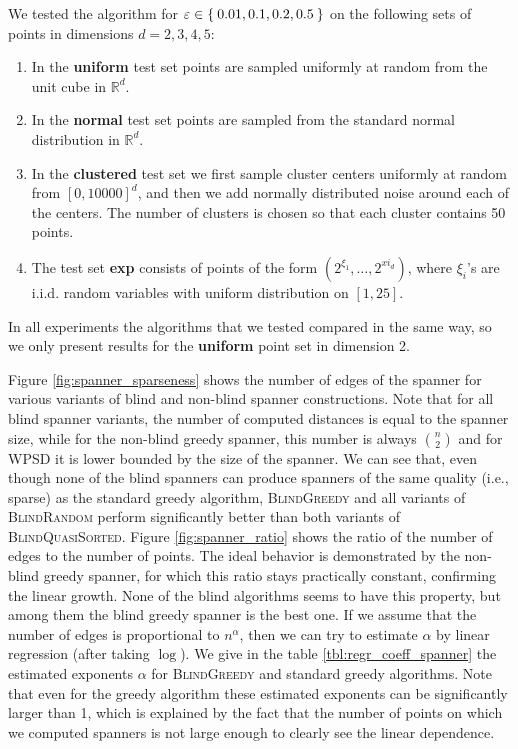\documentclass[a4paper,UKenglish,cleveref, autoref]{lipics-v2019}
\newcommand{\eps}{\varepsilon}
\begin{document}


We tested the algorithm for $\eps \in \Set{0.01, 0.1, 0.2, 0.5}$ on the following sets of points in dimensions $d = 2,3,4,5$:
\begin{enumerate}
    \item In the \textbf{uniform} test set points are sampled uniformly at
        random from the unit cube in $\mathbb{R}^d$.
    \item In the \textbf{normal} test set points are sampled from the standard
        normal distribution in $\mathbb{R}^d$.
    \item In the \textbf{clustered} test set we first sample cluster centers uniformly 
        at random from $[0,10000]^d$, and then we add normally distributed noise around
        each of the centers. The number of clusters is chosen so that each cluster
        contains 50 points.
    \item The test set \textbf{exp} consists of points of the form $(2^{\xi_1}, \dots, 2^{xi_d})$,
        where $\xi_i$'s are i.i.d. random variables with uniform distribution on $[1,25]$.
\end{enumerate}
In all experiments the algorithms that we tested compared in the same way,
so we only present results for the \textbf{uniform} point set in dimension 2.

Figure \ref{fig:spanner_sparseness}
shows the number of edges of the spanner for various variants of 
blind and non-blind spanner constructions.
Note that for all blind spanner variants, the number of computed distances
is equal to the spanner size, while for the non-blind greedy spanner,
this number is always $\binom{n}{2}$ and for WPSD it is lower bounded
by the size of the spanner.
We can see that, even though none of the blind spanners can produce
spanners of the same quality (i.e., sparse) as the standard greedy algorithm,
\textsc{BlindGreedy} and all variants of \textsc{BlindRandom}
perform significantly better than both variants of \textsc{BlindQuasiSorted}.
Figure \ref{fig:spanner_ratio} shows the ratio of the number of edges to the number of points.
The ideal behavior is demonstrated by the non-blind greedy spanner,
for which this ratio stays practically constant, confirming the linear growth.
None of the blind algorithms seems to have this property, but among them
the blind greedy spanner is the best one. If we assume that the number of edges
is proportional to $n^\alpha$, then we can try to estimate $\alpha$ by 
linear regression (after taking $\log$).  We give in the table \ref{tbl:regr_coeff_spanner}
the estimated exponents $\alpha$ for \textsc{BlindGreedy} and standard
greedy algorithms. Note that even for the greedy algorithm these estimated
exponents can be significantly larger than 1,
which is explained by the fact that the number of points
on which we computed spanners is not large enough to clearly see
the linear dependence.
\end{document}
